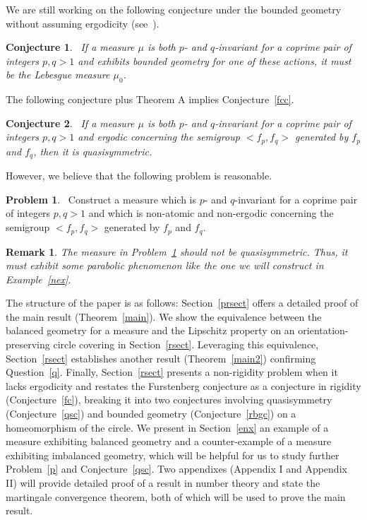 \documentclass[11pt]{amsart}
\newtheorem{remark}{Remark}
\newtheorem{conjecture}{Conjecture}
\theoremstyle{definition}
\newtheorem{problem}{Problem}
\def\m{\mu}
\begin{document}
We are still working on the following conjecture under the bounded geometry without assuming ergodicity (see~\cite{AJ}).

\medskip
\begin{conjecture}~\label{bgconj}
If a measure $\m$ is both $p$- and $q$-invariant for a coprime pair of integers $p, q>1$ and exhibits bounded geometry for one of these actions, it must be the Lebesgue measure $\mu_{0}$.
\end{conjecture} 


\medskip

The following conjecture plus Theorem A implies Conjecture~\ref{fcc}. 
\medskip
\begin{conjecture}~\label{qsconj}
If a measure $\m$ is both $p$- and $q$-invariant for a coprime pair of integers $p, q>1$ and ergodic concerning the semigroup $<f_{p}, f_{q}>$ generated by $f_{p}$ and $f_{q}$, then it is quasisymmetric.
\end{conjecture}

However, we believe that the following problem is reasonable. 

\medskip
\begin{problem}~\label{cexample}
Construct a measure which is $p$- and $q$-invariant for a coprime pair of integers $p, q>1$ and which is non-atomic and non-ergodic concerning the semigroup $<f_{p}, f_{q}>$ generated by $f_{p}$ and $f_{q}$. 
\end{problem}

\medskip
\begin{remark}
The measure in Problem~\ref{cexample} should not be quasisymmetric. Thus, it must exhibit some parabolic phenomenon like the one we will construct in Example~\ref{nex}. 
\end{remark}

The structure of the paper is as follows: Section~\ref{prsect} offers a detailed proof of the main result (Theorem~\ref{main}). We show the equivalence between the balanced geometry for a measure and the Lipschitz property on an orientation-preserving circle covering in Section~\ref{rsect}. Leveraging this equivalence, Section~\ref{rsect} establishes another result (Theorem~\ref{main2}) confirming Question~\ref{q}. Finally, Section~\ref{rsect} presents a non-rigidity problem when it lacks ergodicity and restates the Furstenberg conjecture as a conjecture in rigidity (Conjecture~\ref{fc}), breaking it into two conjectures involving quasisymmetry (Conjecture~\ref{qsc}) and bounded geometry (Conjecture~\ref{rbgc}) on a homeomorphism of the circle.
We present in Section~\ref{enx} an example of a measure exhibiting balanced geometry and a counter-example of a measure exhibiting imbalanced geometry, which will be helpful for us to study further Problem~\ref{p} and Conjecture~\ref{qsc}. Two appendixes (Appendix I and Appendix II) will provide detailed proof of a result in number theory and state the martingale convergence theorem, both of which will be used to prove the main result. 
\end{document}
